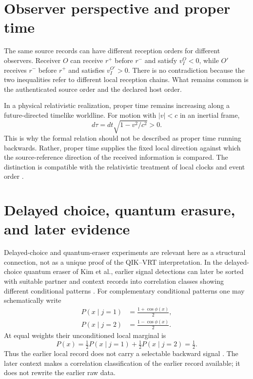 \documentclass[11pt]{article}
\theoremstyle{remark}
\begin{document}
\section{Observer perspective and proper time}
\label{sec:observers}

The same source records can have different reception orders for different
observers. Receiver $O$ can receive $r^+$ before $r^-$ and satisfy
$v_I^O<0$, while $O'$ receives $r^-$ before $r^+$ and satisfies
$v_I^{O'}>0$. There is no contradiction because the two inequalities refer to
different local reception chains. What remains common is the authenticated
source order and the declared host order.

In a physical relativistic realization, proper time remains increasing along a
future-directed timelike worldline. For motion with $|v|<c$ in an inertial
frame,
\begin{equation}
  d\tau=dt\sqrt{1-v^2/c^2}>0.
\end{equation}
This is why the formal relation should not be described as proper time
running backwards. Rather, proper time supplies the fixed local direction
against which the source-reference direction of the received information is
compared. The distinction is compatible with the relativistic treatment of
local clocks and event order \cite{Einstein1905,Minkowski1909}.

\section{Delayed choice, quantum erasure, and later evidence}
\label{sec:quantum}

Delayed-choice and quantum-eraser experiments are relevant here as a
structural connection, not as a unique proof of the QIK--VRT interpretation.
In the delayed-choice quantum eraser of Kim et al., earlier signal detections
can later be sorted with suitable partner and context records into correlation
classes showing different conditional patterns \cite{ScullyDruehl1982,Kim2000}.
For complementary conditional patterns one may schematically write
\begin{align}
  P(x\mid j=1)&=\frac{1+\cos\phi(x)}{2},\\
  P(x\mid j=2)&=\frac{1-\cos\phi(x)}{2}.
\end{align}
At equal weights their unconditioned local marginal is
\begin{equation}
  P(x)=\tfrac12P(x\mid j=1)+\tfrac12P(x\mid j=2)=\tfrac12.
\end{equation}
Thus the earlier local record does not carry a selectable backward signal
\cite{Jordan1983}. The later context makes a correlation classification of
the earlier record available; it does not rewrite the earlier raw data.
\end{document}
